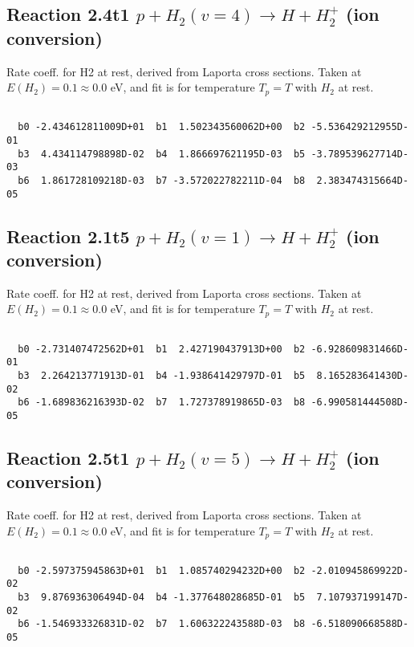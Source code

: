 \documentclass[12pt,dvipdfmx]{article}
\begin{document}
\newpage
\subsection{
Reaction 2.4t1
$ p + H_2(v=4) \rightarrow H + H_2^+$ (ion conversion)
}
Rate coeff. for H2 at rest, derived from Laporta cross sections.
Taken at $E(H_2) = 0.1 \approx 0.0$ eV,  and fit is for temperature $T_p=T$ with $H_2$ at rest.

\begin{small}\begin{verbatim}

  b0 -2.434612811009D+01  b1  1.502343560062D+00  b2 -5.536429212955D-01
  b3  4.434114798898D-02  b4  1.866697621195D-03  b5 -3.789539627714D-03
  b6  1.861728109218D-03  b7 -3.572022782211D-04  b8  2.383474315664D-05

\end{verbatim}\end{small}

\newpage
\subsection{
Reaction 2.1t5
$ p + H_2(v=1) \rightarrow H + H_2^+$ (ion conversion)
}
Rate coeff. for H2 at rest, derived from Laporta cross sections.
Taken at $E(H_2) = 0.1 \approx 0.0$ eV,  and fit is for temperature $T_p=T$ with $H_2$ at rest.

\begin{small}\begin{verbatim}

  b0 -2.731407472562D+01  b1  2.427190437913D+00  b2 -6.928609831466D-01
  b3  2.264213771913D-01  b4 -1.938641429797D-01  b5  8.165283641430D-02
  b6 -1.689836216393D-02  b7  1.727378919865D-03  b8 -6.990581444508D-05

\end{verbatim}\end{small}

\newpage
\subsection{
Reaction 2.5t1
$ p + H_2(v=5) \rightarrow H + H_2^+$ (ion conversion)
}
Rate coeff. for H2 at rest, derived from Laporta cross sections.
Taken at $E(H_2) = 0.1 \approx 0.0$ eV,  and fit is for temperature $T_p=T$ with $H_2$ at rest.

\begin{small}\begin{verbatim}

  b0 -2.597375945863D+01  b1  1.085740294232D+00  b2 -2.010945869922D-02
  b3  9.876936306494D-04  b4 -1.377648028685D-01  b5  7.107937199147D-02
  b6 -1.546933326831D-02  b7  1.606322243588D-03  b8 -6.518090668588D-05

\end{verbatim}\end{small}
\end{document}
